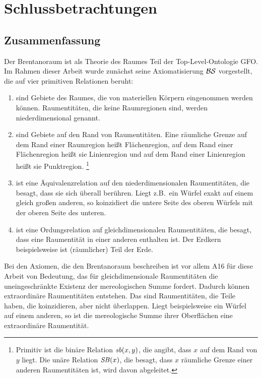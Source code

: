 \chapter{Schlussbetrachtungen}\label{chap:diskussion}

    \section{Zusammenfassung}
    Der
    Brentanoraum ist als Theorie des Raumes Teil der Top-Level-Ontologie GFO.
    Im Rahmen dieser Arbeit wurde zunächst seine Axiomatisierung $\mathcal{BS}$ vorgestellt,
    die auf vier primitiven Relationen beruht:
    \begin{enumerate}
        \item {} 
            sind Gebiete des Raumes, die von materiellen Körpern eingenommen werden können.
            Raumentitäten, die keine Raumregionen sind, werden niederdimensional genannt.
        \item {} 
            sind Gebiete auf den Rand von Raumentitäten. 
            Eine räumliche Grenze auf dem Rand einer Raumregion heißt Flächenregion, auf dem Rand einer Flächenregion heißt sie Linienregion und auf dem Rand einer Linienregion heißt sie Punktregion.%
            \footnote{
                Primitiv ist die binäre Relation $\mathit{sb}(x,y)$, die angibt, dass $x$ auf dem Rand von $y$ liegt.
                Die unäre Relation $\mathit{S\hspace*{-0.25ex}B}(x)$, die besagt, dass $x$ räumliche Grenze einer anderen Raumentitäten ist, wird davon abgeleitet.
            }
        \item {}
            ist eine Äquivalenzrelation auf den niederdimensionalen Raumentitäten, die besagt, dass sie sich überall berühren.
            Liegt z.B.\ ein Würfel exakt auf einem gleich großen anderen, so koinzidiert die untere Seite des oberen Würfels mit der oberen Seite des unteren.
        \item {}
            ist eine Ordungsrelation auf gleichdimensionalen Raumentitäten, die besagt, dass eine Raumentität in einer anderen enthalten ist.
            Der Erdkern beispielsweise ist (räumlicher) Teil der Erde.
    \end{enumerate}

    Bei
    den Axiomen, die den Brentanoraum beschreiben ist vor allem A16 für diese Arbeit von Bedeutung, das für gleichdimensionale Raumentitäten die uneingeschränkte Existenz der mereologischen Summe fordert.
    Dadurch können extraordinäre Raumentitäten entstehen. 
    Das sind Raumentitäten, die Teile haben, die koinzidieren, aber nicht überlappen.
    Liegt beispielsweise ein Würfel auf einem anderen, so ist die mereologische Summe ihrer Oberflächen eine extraordinäre Raumentität.
    

